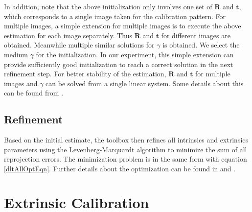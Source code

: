 \documentclass{report}
\begin{document}
In addition, note that the above initialization only involves one set of $\mathbf{R}$ and $\mathbf{t}$, which corresponds to a single image taken for the calibration pattern. For multiple images, a simple extension for multiple images is to execute the above estimation for each image separately. Thus $\mathbf{R}$ and $\mathbf{t}$ for different images are obtained. Meanwhile multiple similar solutions for $\gamma$ is obtained. We select the medium $\gamma$ for the initialization. In our experiment, this simple extension can provide sufficiently good initialization to reach a correct solution in the next refinement step. For better stability of the estimation, $\mathbf{R}$ and $\mathbf{t}$ for multiple images and $\gamma$ can be solved from a single linear system. Some details about this can be found from \cite{scaramuzza2006toolbox}. 

\section{Refinement}
Based on the initial estimate, the toolbox then refines all intrinsics and extrinsics parameters using the Levenberg-Marquardt algorithm to minimize the sum of all reprojection errors. The minimization problem is in the same form with equation \ref{dltAllOptEqn}. Further details about the optimization can be found in \cite{mei2007single} and \cite{scaramuzza2006toolbox}.




\chapter{Extrinsic Calibration}
\label{extrinsicSec}

\end{document}
